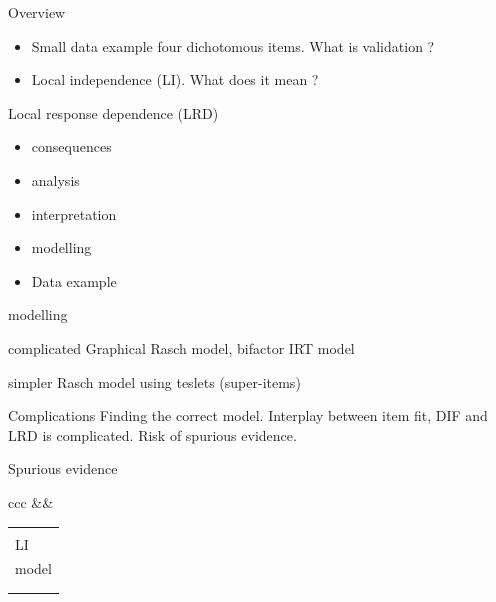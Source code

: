 \documentclass[xcolor=table]{beamer}
\begin{document}
\begin{frame}{Overview}
\begin{itemize}
\item[\checkmark] Small data example four dichotomous items. What is validation ?
\item[\checkmark] Local independence (LI). What does it mean ?
\end{itemize}
\begin{block}{Local response dependence (LRD)}
\begin{itemize}
\item[\checkmark] consequences
\item[\checkmark] analysis
\item[\checkmark] interpretation 
\item[O] modelling 
\end{itemize}
\end{block}
\begin{itemize}
\item[O] Data example
\end{itemize}
\end{frame}

\begin{frame}{modelling}
\begin{block}{complicated}
Graphical Rasch model, bifactor IRT model
\end{block}
\pause
\begin{block}{simpler}
Rasch model using teslets (super-items)
\end{block}
\pause
\begin{block}{Complications}
Finding the correct model. Interplay between item fit, DIF and LRD is complicated. Risk of spurious evidence.
\end{block}

\end{frame}


\begin{frame}{Spurious evidence}
\begin{tabular}{ccc}
&&
\begin{tabular}{l}
\\
\\
LI \\
model \\
\\
\\
\end{tabular}
\end{tabular}
\end{frame}
\end{document}
